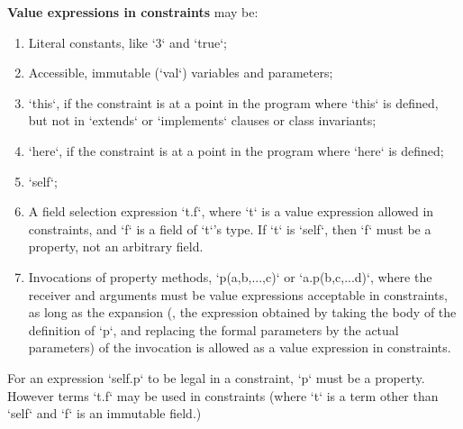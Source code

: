 {\bf Value expressions in constraints} may be: 
\begin{enumerate}
\item Literal constants, like \xcd`3` and \xcd`true`;
\item Accessible, immutable (\xcd`val`) variables and parameters;
\item \xcd`this`, if the constraint is at a point in the program where
      \xcd`this` is defined, but not in \xcd`extends` or \xcd`implements`
      clauses or class invariants;
\item \xcd`here`, if the constraint is at a point in the program where \xcd`here` is defined;
\item \xcd`self`;
\item A field selection expression \xcd`t.f`, where \xcd`t` is a value
      expression allowed in constraints, and \xcd`f` is a field of \xcd`t`'s
      type.   If \xcd`t` is \xcd`self`, then \xcd`f` must be a property, not
      an arbitrary field.
 \item Invocations of property methods,  \xcd`p(a,b,...,c)` or
      \xcd`a.p(b,c,...d)`, where the receiver and arguments must be
       value expressions acceptable in constraints, as long as the expansion
       (\viz, the expression obtained by taking the body of the definition of
       \xcd`p`, and replacing the formal parameters by the actual parameters)
       of the invocation is allowed as a value expression in constraints.  
\end{enumerate}
For an expression \xcd`self.p` to be legal in a constraint, 
\xcd`p` must be 
a property. However terms \xcd`t.f` may be
used in constraints (where \xcd`t` is a term other than \xcd`self` and
\xcd`f` is an immutable field.)

